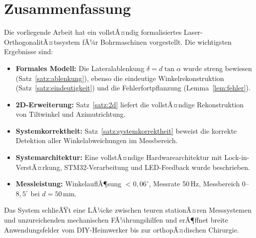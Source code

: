 ﻿\documentclass[a4paper,12pt]{article}
\theoremstyle{definition}
\begin{document}
\section{Zusammenfassung}

Die vorliegende Arbeit hat ein vollstÃ¤ndig formalisiertes Laser-OrthogonalitÃ¤tssystem
fÃ¼r Bohrmaschinen vorgestellt. Die wichtigsten Ergebnisse sind:

\begin{itemize}
  \item \textbf{Formales Modell:} Die Lateralablenkung $\delta = d\tan\alpha$
    wurde streng bewiesen (Satz~\ref{satz:ablenkung}), ebenso die eindeutige
    Winkelrekonstruktion (Satz~\ref{satz:eindeutigkeit}) und die
    Fehlerfortpflanzung (Lemma~\ref{lem:fehler}).
  \item \textbf{2D-Erweiterung:} Satz~\ref{satz:2d} liefert die vollstÃ¤ndige
    Rekonstruktion von Tilt\-winkel und Azimut\-richtung.
  \item \textbf{Systemkorrektheit:} Satz~\ref{satz:systemkorrektheit} beweist
    die korrekte Detektion aller Winkel\-abweichungen im Messbereich.
  \item \textbf{Systemarchitektur:} Eine vollstÃ¤ndige Hardwarearchitektur mit
    Lock-in-VerstÃ¤rkung, STM32-Verarbeitung und LED-Feedback wurde beschrieben.
  \item \textbf{Messleistung:} Winkel\-auflÃ¶sung $< 0{,}06^\circ$, Messrate 50\,Hz,
    Messbereich $0$--$8{,}5^\circ$ bei $d = 50\,\mathrm{mm}$.
\end{itemize}

Das System schlieÃŸt eine LÃ¼cke zwischen teuren stationÃ¤ren Messsystemen
und unzureichenden mechanischen FÃ¼hrungshilfen und erÃ¶ffnet breite
Anwendungsfelder vom DIY-Heimwerker bis zur orthopÃ¤dischen Chirurgie.
\end{document}
